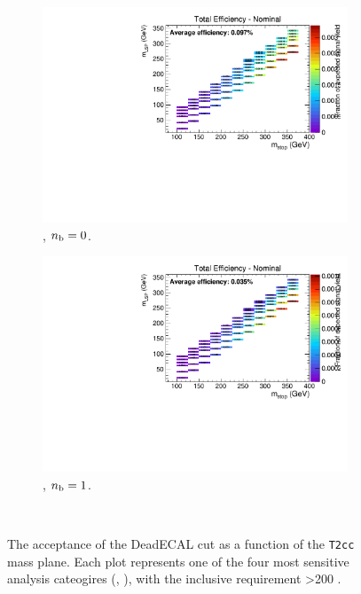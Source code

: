 \begin{figure}[h!]
  \begin{subfigure}[b]{0.4\textwidth}
    \includegraphics[width=\textwidth, page=3]{Figs/sms/t2cc/v24/DeadECAL_T2cc_v24_eq0b_ge4j_incl.pdf}
    \caption{\njhigh, $n_{\text{b}} = 0$.}
  \end{subfigure}
  \begin{subfigure}[b]{0.4\textwidth}
    \includegraphics[width=\textwidth, page=3]{Figs/sms/t2cc/v24/DeadECAL_T2cc_v24_eq1b_ge4j_incl.pdf}
    \caption{\njhigh, $n_{\text{b}} = 1$.}
  \end{subfigure}\\
  \caption{The acceptance of the DeadECAL cut as a function of the \texttt{T2cc}
  mass plane. Each plot represents one of the four most sensitive 
  analysis cateogires (\nb, \nj), with the inclusive requirement \HT>200 \gev.}
  \label{fig:sms-deadecal-t2cc}
\end{figure}


